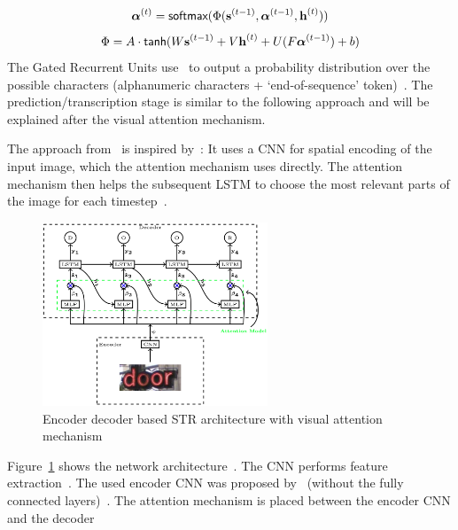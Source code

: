 \begin{equation}\label{eq:sequential-attention-weights}
    \boldsymbol{\alpha}^{(t)}=\textsf{softmax}(\Phi(\textbf{s}^{(t-1)},\boldsymbol{\alpha}^{(t-1)},
        \textbf{h}^{(t)}))
\end{equation}
\begin{equation}\label{eq:sequential-attention-scoring}
    \Phi=A\cdot\textsf{tanh}(W\textbf{s}^{(t-1)}+V\textbf{h}^{(t)}+U(F\boldsymbol{\alpha}^{(t-1)})+b)
\end{equation}
The Gated Recurrent Units use \sfmx\ to output a probability distribution over the possible
characters (alphanumeric characters + `end-of-sequence' token)~\citep{shi_robust_2016}.
The prediction/transcription stage is similar to the following approach and will be explained after
the visual attention mechanism.

The approach from~\cite{ghosh_visual_2017} is inspired by~\cite{bahdanau_neural_2016,xu_show_2016}:
It uses a \ac{CNN} for spatial encoding of the input image, which the attention mechanism uses
directly.
The attention mechanism then helps the subsequent \ac{LSTM} to choose the most relevant parts of the
image for each timestep~\citep{ghosh_visual_2017}.
\begin{figure}[h]
    \centering
    \includegraphics[width=0.60\textwidth]{img/STR-encdec-attention-Gosh-Visual-2017.png}
    \caption[Encoder decoder \& visual attention based STR architecture]{%
        Encoder decoder based STR architecture with visual attention
        mechanism~\citep{ghosh_visual_2017}\label{fig:STR-attention}
    }
\end{figure}
Figure~\ref{fig:STR-attention} shows the network architecture~\citep{ghosh_visual_2017}.
The \ac{CNN} performs feature extraction~\citep{ghosh_visual_2017}.
The used encoder \ac{CNN} was proposed by~\cite{jaderberg_reading_2014} (without the fully connected
layers)~\citep{ghosh_visual_2017}.
The attention mechanism is placed between the encoder \ac{CNN} and the decoder
